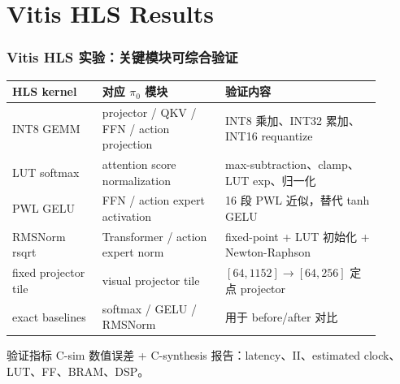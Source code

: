 \documentclass[10pt, aspectratio=169]{beamer}
\newcommand{\piZero}{\texorpdfstring{$\pi_0$}{pi0}\xspace}
\begin{document}
\section{Vitis HLS Results}

\begin{frame}
  \frametitle{Vitis HLS 实验：关键模块可综合验证}
  \small
  \begin{table}
    \scriptsize
    \setlength{\tabcolsep}{2pt}
    \begin{tabular}{@{}p{0.22\linewidth}p{0.30\linewidth}p{0.38\linewidth}@{}}
      \toprule
      HLS kernel & 对应 \piZero 模块 & 验证内容 \\
      \midrule
      INT8 GEMM & projector / QKV / FFN / action projection & INT8 乘加、INT32 累加、INT16 requantize \\
      LUT softmax & attention score normalization & max-subtraction、clamp、LUT exp、归一化 \\
      PWL GELU & FFN / action expert activation & 16 段 PWL 近似，替代 tanh GELU \\
      RMSNorm rsqrt & Transformer / action expert norm & fixed-point + LUT 初始化 + Newton-Raphson \\
      fixed projector tile & visual projector tile & $[64,1152]\rightarrow[64,256]$ 定点 projector \\
      exact baselines & softmax / GELU / RMSNorm & 用于 before/after 对比 \\
      \bottomrule
    \end{tabular}
  \end{table}

  \begin{exampleblock}{验证指标}
    C-sim 数值误差 + C-synthesis 报告：latency、II、estimated clock、LUT、FF、BRAM、DSP。
  \end{exampleblock}
\end{frame}
\end{document}
